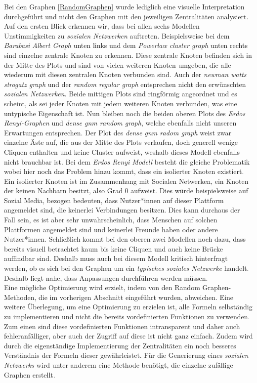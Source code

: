 Bei den Graphen \ref{RandomGraphen} wurde lediglich eine visuelle Interpretation durchgeführt und nicht den Graphen mit den jeweiligen Zentralitäten analysiert. Auf den ersten Blick erkennen wir, dass bei allen sechs Modellen Unstimmigkeiten zu \textit{sozialen Netzwerken} auftreten. Beispielsweise bei dem \textit{Barabasi Albert Graph} unten links und dem \textit{Powerlaw cluster graph} unten rechts sind einzelne zentrale Knoten zu erkennen. Diese zentrale Knoten befinden sich in der Mitte des Plots und sind von vielen weiteren Knoten umgeben, die alle wiederum mit diesen zentralen Knoten verbunden sind. Auch der \textit{newman watts strogatz graph} und der \textit{random regular graph} entsprechen nicht den erwünschten \textit{sozialen Netzwerken}. Beide mittigen Plots sind ringförmig angeordnet und es scheint, als sei jeder Knoten mit jedem weiteren Knoten verbunden, was eine untypische Eigenschaft ist. Nun bleiben noch die beiden oberen Plots des \textit{Erdos Renyi-Graphen} und \textit{dense gnm random graph}, welche ebenfalls nicht unseren Erwartungen entsprechen. Der Plot des \textit{dense gnm radom graph} weist zwar einzelne Äste auf, die aus der Mitte des Plots verlaufen, doch generell wenige Cliquen enthalten und keine Cluster aufweist, weshalb dieses Modell ebenfalls nicht brauchbar ist. Bei dem \textit{Erdos Renyi Modell} besteht die gleiche Problematik wobei hier noch das Problem hinzu kommt, dass ein isolierter Knoten existiert. Ein isolierter Knoten ist im Zusammenhang mit Socialen Netwerken, ein Knoten der keinen Nachbarn besitzt, also Grad $0$ aufweist.
Dies würde beispielsweise auf Sozial Media, bezogen bedeuten, dass Nutzer*innen auf dieser Plattform angemeldet sind, die keinerlei Verbindungen besitzen. Dies kann durchaus der Fall sein, es ist aber sehr unwahrscheinlich, dass Menschen auf solchen Plattformen angemeldet sind und keinerlei Freunde haben oder andere Nutzer*innen. Schließlich kommt bei den oberen zwei Modellen noch dazu, dass bereits visuell betrachtet kaum bis keine Cliquen und auch keine Brücke auffindbar sind. Deshalb muss auch bei diesem Modell kritisch hinterfragt werden, ob es sich bei den Graphen um ein \textit{typisches soziales Netzwerke} handelt. Deshalb liegt nahe, dass Anpassungen durchführen werden müssen.\\


Eine mögliche Optimierung wird erzielt, indem von den Random Graphen-Methoden, die im vorherigen Abschnitt eingeführt wurden, abweichen. Eine weitere Überlegung, um eine Optimierung zu erzielen ist, alle Formeln selbständig zu implementieren und nicht die bereits vordefinierten Funktionen zu verwenden. Zum einen sind diese vordefinierten Funktionen intransparent und daher auch fehleranfälliger, aber auch der Zugriff auf diese ist nicht ganz einfach. Zudem wird durch die eigenständige Implementierung der Zentralitäten ein noch besseres Verständnis der Formeln dieser gewährleistet.
Für die Generierung eines \textit{sozialen Netzwerks} wird unter anderem eine Methode benötigt, die einzelne zufällige Graphen erstellt. 

